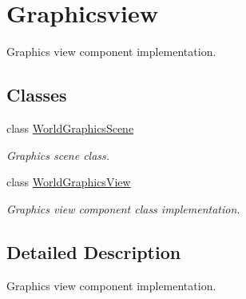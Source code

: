 \hypertarget{group__graphicsview}{}\section{Graphicsview}
\label{group__graphicsview}


Graphics view component implementation.  


\subsection*{Classes}
\begin{DoxyCompactItemize}
\item 
class \hyperlink{classWorldGraphicsScene}{World\+Graphics\+Scene}
\begin{DoxyCompactList}\small\item\em Graphics scene class. \end{DoxyCompactList}\item 
class \hyperlink{classWorldGraphicsView}{World\+Graphics\+View}
\begin{DoxyCompactList}\small\item\em Graphics view component class implementation. \end{DoxyCompactList}\end{DoxyCompactItemize}


\subsection{Detailed Description}
Graphics view component implementation. 

